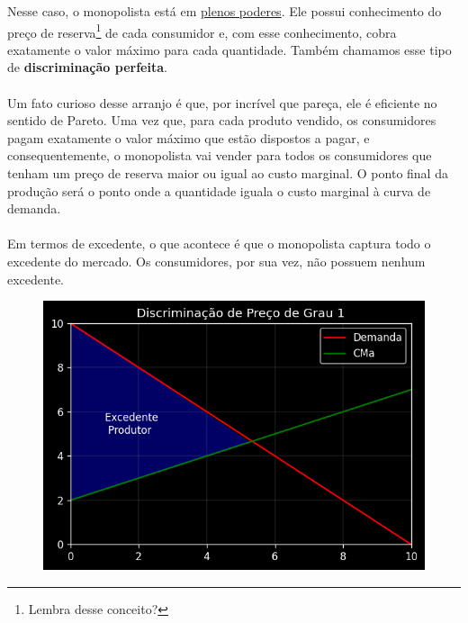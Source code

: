 \documentclass[a4paper,11pt,oneside]{book}
\theoremstyle{definition}
\theoremstyle{break}
\begin{document}
Nesse caso, o monopolista está em \href{https://www.encurtador.com.br/eqCN1}{plenos poderes}. Ele possui conhecimento do preço de reserva\footnote{Lembra desse conceito?} de cada consumidor e, com esse conhecimento, cobra exatamente o valor máximo para cada quantidade. Também chamamos esse tipo de \textbf{discriminação perfeita}.
\\~\\
Um fato curioso desse arranjo é que, por incrível que pareça, ele é eficiente no sentido de Pareto. Uma vez que, para cada produto vendido, os consumidores pagam exatamente o valor máximo que estão dispostos a pagar, e consequentemente, o monopolista vai vender para todos os consumidores que tenham um preço de reserva maior ou igual ao custo marginal. O ponto final da produção será o ponto onde a quantidade iguala o custo marginal à curva de demanda.
\\~\\
Em termos de excedente, o que acontece é que o monopolista captura todo o excedente do mercado. Os consumidores, por sua vez, não possuem nenhum excedente.

\begin{figure}[H]
\centering
\includegraphics[scale=0.6]{cap26_2-discriminacao_grau1.png}
\end{figure}
\end{document}

